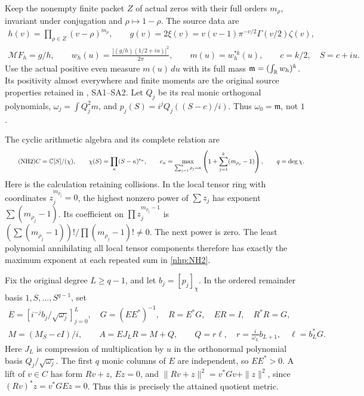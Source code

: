 \documentclass[11pt]{article}
\begin{document}
Keep the nonempty finite packet \(Z\) of actual zeros with
their full orders \(m_\rho\), invariant under conjugation
and \(\rho\mapsto1-\rho\). The source data are
\begin{equation}\tag{NH1}\label{nhp:NH1}
\begin{gathered}
h(v)=\prod_{\rho\in Z}(v-\rho)^{m_\rho},\qquad
g(v)=2\xi(v)=v(v-1)\pi^{-v/2}\Gamma(v/2)\zeta(v),\\
\mathcal M F_h=g/h,\qquad
w_h(u)=\frac{|(g/h)(1/2+iu)|^2}{2\pi},\qquad
m(u)=w_h^{*k}(u),\qquad c=k/2,\quad S=c+iu .
\end{gathered}
\end{equation}
Use the actual positive even measure \(m(u)\,du\) with
its full mass
\(\mathfrak m=(\int_\mathbb R w_h)^k\). Its positivity almost
everywhere and finite moments are the original source
properties retained in \cite{nhp:NativeAction}, SA1--SA2.
Let \(Q_j\) be its real monic orthogonal polynomials,
\(\omega_j=\int Q_j^2m\), and
\(p_j(S)=i^jQ_j((S-c)/i)\). Thus
\(\omega_0=\mathfrak m\), not \(1\).

The cyclic arithmetic algebra and its complete relation are
\begin{equation}\tag{NH2}\label{nhp:NH2}
C=\mathbb C[S]/(\chi),\qquad
\chi(S)=\prod_\kappa(S-\kappa)^{e_\kappa},\qquad
e_\kappa=\max_{\sum_{j=1}^k\rho_j=\kappa}
\left(1+\sum_{j=1}^k(m_{\rho_j}-1)\right),\qquad q=\deg\chi .
\end{equation}
Here is the calculation retaining collisions. In the local
tensor ring with coordinates \(z_j^{m_{\rho_j}}=0\),
the highest nonzero power of \(\sum z_j\) has exponent
\(\sum(m_{\rho_j}-1)\). Its coefficient on
\(\prod z_j^{m_{\rho_j}-1}\) is
\((\sum(m_{\rho_j}-1))!/\prod(m_{\rho_j}-1)!\ne0\).
The next power is zero. The least polynomial annihilating
all local tensor components therefore has exactly the
maximum exponent at each repeated sum in \eqref{nhp:NH2}.

Fix the original degree \(L\ge q-1\), and let \(b_j=[p_j]_\chi\).
In the ordered remainder basis \(1,S,\ldots,S^{q-1}\), set
\begin{equation}\tag{NH3}\label{nhp:NH3}
\begin{gathered}
E=[i^{-j}b_j/\sqrt{\omega_j}]_{j=0}^L,\quad
G=(EE^*)^{-1},\quad R=E^*G,\quad ER=I,\quad R^*R=G,\\
M=(M_S-cI)/i,\qquad
A=EJ_LR=M+Q,\qquad
Q=r\ell,\quad r=\frac{i}{\omega_L}b_{L+1},\quad
\ell=b_L^*G .
\end{gathered}
\end{equation}
Here \(J_L\) is compression of multiplication by \(u\)
in the orthonormal polynomial basis
\(Q_j/\sqrt{\omega_j}\).
The first \(q\) monic columns of \(E\) are independent,
so \(EE^*>0\). A lift of \(v\in C\) has form \(Rv+z\),
\(Ez=0\), and
\(\|Rv+z\|^2=v^*Gv+\|z\|^2\), since
\((Rv)^*z=v^*GEz=0\).
Thus this is precisely the attained quotient metric.
\end{document}
